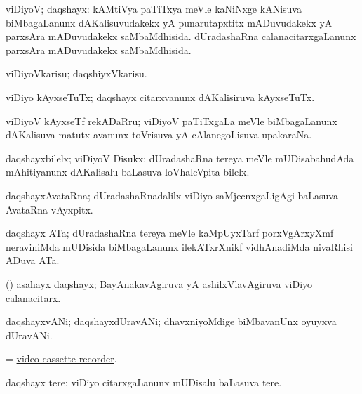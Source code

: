 \bentry
{} 
\gl{\gu}
\expl{}
\bmng
viDiyoV; daqshayx: 
\banum
{} kAMtiVya paTiTxya meVle kaNiNxge kANisuva biMbagaLanunx dAKalisuvudakekx yA punarutapxtitx mADuvudakekx yA parxsAra mADuvudakekx saMbaMdhisida. 
 dUradashaRna calanacitarxgaLanunx parxsAra mADuvudakekx saMbaMdhisida. 
\eanum
\emng
\eentry

\bentry
{} 
\gl{\sakirx}
\bmng
 viDiyoVkarisu; daqshiyxVkarisu. 
\emng
\eentry

\bentry
{}
\gl{\nA}
\expl{}
\bmng
 viDiyo kAyxseTuTx; daqshayx citarxvanunx dAKalisiruva kAyxseTuTx. 
\emng
\eentry

\bentry
{}
\gl{\nA}
\expl{}
\bmng
 viDiyoV kAyxseTf rekADaRru; viDiyoV paTiTxgaLa meVle biMbagaLanunx dAKalisuva matutx avanunx toVrisuva yA cAlanegoLisuva upakaraNa. 
\emng
\eentry

\bentry
{} 
\gl{\nA}
\expl{}
\bmng
 daqshayxbilelx; viDiyoV Disukx; dUradashaRna tereya meVle mUDisabahudAda mAhitiyanunx dAKalisalu baLasuva loVhaleVpita bilelx. 
\emng
\eentry

\bentry
{}
\gl{\nA}
\expl{}
\bmng
 daqshayxAvataRna; dUradashaRnadalilx viDiyo saMjecnxgaLigAgi baLasuva AvataRna vAyxpitx. 
\emng
\eentry

\bentry
{}
\gl{\nA}
\expl{}
\bmng
 daqshayx ATa; dUradashaRna tereya meVle kaMpUyxTarf porxVgArxyXmf neraviniMda mUDisida biMbagaLanunx ilekATxrXnikf vidhAnadiMda nivaRhisi ADuva ATa. 
\emng
\eentry

\bentry
{} 
\gl{\nA}
\expl{}
\bmng
 (\AmA) asahayx daqshayx; BayAnakavAgiruva yA ashilxVlavAgiruva viDiyo calanacitarx. 
\emng
\eentry

\bentry
{} 
\gl{\nA}
\expl{}
\bmng
 daqshayxvANi; daqshayxdUravANi; dhavxniyoMdige biMbavanUnx oyuyxva dUravANi. 
\emng
\eentry

\bentry
{}
\gl{\nA}
\expl{}
\bmng
 = \hyperlink{video cassette recorder}{video cassette recorder}. 
\emng
\eentry

\bentry
{}
\gl{\nA}
\expl{}
\bmng
 daqshayx tere; viDiyo citarxgaLanunx mUDisalu baLasuva tere. 
\emng
\eentry

